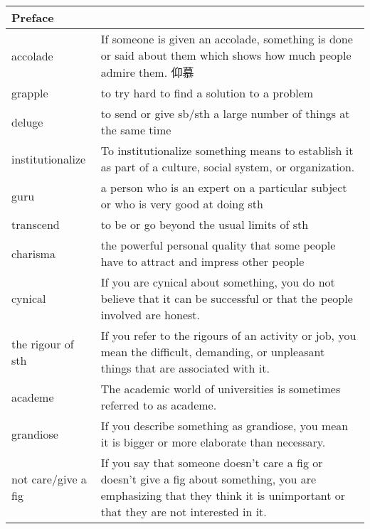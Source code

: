 \documentclass{article}
\begin{document}
\begin{center}
\begin{longtable}{|l|p{9cm}|}

\hline
\multicolumn{2}{|l|}{\textbf{Preface}}\\
\hline
accolade
&
If someone is given an accolade, something is done or said about them which shows how much people admire them. 仰慕
\\

\hline
grapple
&
to try hard to find a solution to a problem
\\

\hline
deluge
&
to send or give sb/sth a large number of things at the same time
\\

\hline
institutionalize
&
To institutionalize something means to establish it as part of a culture, social system, or organization.
\\

\hline
guru
&
a person who is an expert on a particular subject or who is very good at doing sth
\\

\hline
transcend
&
to be or go beyond the usual limits of sth
\\

\hline
charisma
&
the powerful personal quality that some people have to attract and impress other people
\\

\hline
cynical
&
If you are cynical about something, you do not believe that it can be successful or that the people involved are honest.
\\

\hline
the rigour of sth
&
If you refer to the rigours of an activity or job, you mean the difficult, demanding, or unpleasant things that are associated with it.
\\

\hline
academe
&
The academic world of universities is sometimes referred to as academe.
\\

\hline
grandiose
&
If you describe something as grandiose, you mean it is bigger or more elaborate than necessary.
\\

\hline
not care/give a fig
&
If you say that someone doesn't care a fig or doesn't give a fig about something, you are emphasizing that they think it is unimportant or that they are not interested in it.
\\


\end{longtable}
\end{center}
\end{document}
